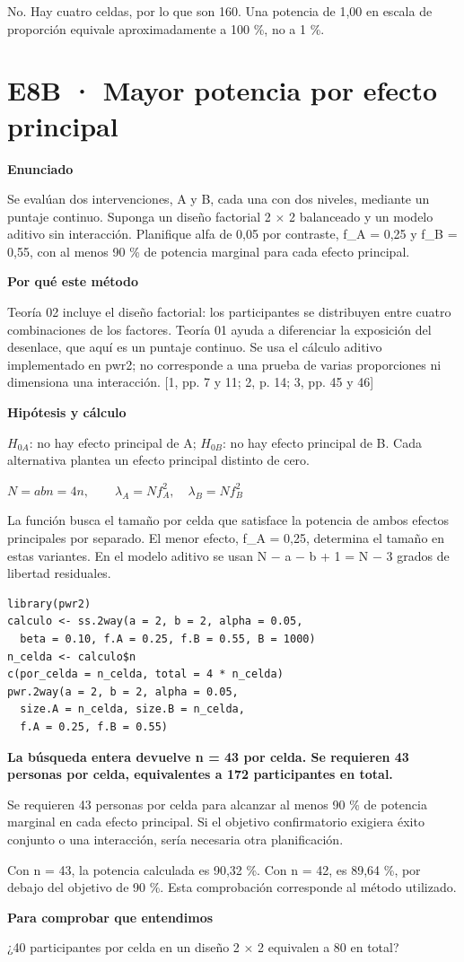\documentclass[10pt,a4paper]{article}
\newcommand{\etiqueta}[1]{\par{\bfseries\color{Blue}#1}\par}
\newcommand{\cajares}[1]{\par\colorbox{Pale}{\parbox{\dimexpr\linewidth-2\fboxsep}{\vspace{4pt}\textbf{\color{Navy}#1}\vspace{4pt}}}\par}
\begin{document}
{\small No. Hay cuatro celdas, por lo que son 160. Una potencia de 1,00 en escala de proporción equivale aproximadamente a 100 \%, no a 1 \%.}
\clearpage
\section*{E8B · Mayor potencia por efecto principal}
\etiqueta{Enunciado}
Se evalúan dos intervenciones, A y B, cada una con dos niveles, mediante un puntaje continuo. Suponga un diseño factorial 2 \ensuremath{\times} 2 balanceado y un modelo aditivo sin interacción. Planifique alfa de 0,05 por contraste, f\_A = 0,25 y f\_B = 0,55, con al menos 90 \% de potencia marginal para cada efecto principal.
\etiqueta{Por qué este método}
Teoría 02 incluye el diseño factorial: los participantes se distribuyen entre cuatro combinaciones de los factores. Teoría 01 ayuda a diferenciar la exposición del desenlace, que aquí es un puntaje continuo. Se usa el cálculo aditivo implementado en pwr2; no corresponde a una prueba de varias proporciones ni dimensiona una interacción. [1, pp. 7 y 11; 2, p. 14; 3, pp. 45 y 46]
\etiqueta{Hipótesis y cálculo}
$H_{0A}$: no hay efecto principal de A; $H_{0B}$: no hay efecto principal de B. Cada alternativa plantea un efecto principal distinto de cero.

$N=abn=4n,\qquad \lambda_A=Nf_A^2,\quad \lambda_B=Nf_B^2$

La función busca el tamaño por celda que satisface la potencia de ambos efectos principales por separado. El menor efecto, f\_A = 0,25, determina el tamaño en estas variantes. En el modelo aditivo se usan N \ensuremath{-} a \ensuremath{-} b + 1 = N \ensuremath{-} 3 grados de libertad residuales.
\begin{Verbatim}
library(pwr2)
calculo <- ss.2way(a = 2, b = 2, alpha = 0.05,
  beta = 0.10, f.A = 0.25, f.B = 0.55, B = 1000)
n_celda <- calculo$n
c(por_celda = n_celda, total = 4 * n_celda)
pwr.2way(a = 2, b = 2, alpha = 0.05,
  size.A = n_celda, size.B = n_celda,
  f.A = 0.25, f.B = 0.55)
\end{Verbatim}
\cajares{La búsqueda entera devuelve n = 43 por celda. Se requieren 43 personas por celda, equivalentes a 172 participantes en total.}
Se requieren 43 personas por celda para alcanzar al menos 90 \% de potencia marginal en cada efecto principal. Si el objetivo confirmatorio exigiera éxito conjunto o una interacción, sería necesaria otra planificación.

{\small\color{Gray}Con n = 43, la potencia calculada es 90,32 \%. Con n = 42, es 89,64 \%, por debajo del objetivo de 90 \%. Esta comprobación corresponde al método utilizado.}
\etiqueta{Para comprobar que entendimos}
¿40 participantes por celda en un diseño 2 \ensuremath{\times} 2 equivalen a 80 en total?
\end{document}
